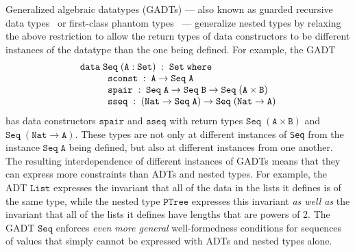 \documentclass{lmcs}
\theoremstyle{plain}\newtheorem{satz}[thm]{Satz}
\begin{document}
{Generalized algebraic datatypes (GADTs) --- also known as guarded
recursive data types~\cite{xcc03} or first-class phantom
types~\cite{ch03} --- generalize nested types by relaxing the above
restriction to allow the return types of data constructors to be
different instances of the datatype than the one being defined. For
example, the GADT
\[\begin{array}{l}
\mathtt{data\; Seq \;(A : Set)\;:\;Set\;where}\\
\hspace*{0.4in}\mathtt{sconst\;:\; A \rightarrow Seq\;A}\\
\hspace*{0.4in}\mathtt{spair\;:\;Seq\;A \rightarrow Seq\;B \rightarrow
  Seq\;(A\times B)}\\
\hspace*{0.4in}\mathtt{sseq\;:\;(Nat \rightarrow Seq\;A) \rightarrow
  Seq\;(Nat \to A)}
\end{array}\]
\noindent
\!\!has data constructors $\mathtt{spair}$ and $\mathtt{sseq}$ with
return types $\mathtt{Seq\; (A \times B)}$ and $\mathtt{Seq\;(Nat \to
  A)}$. These types are not only at different instances of \verb|Seq|
from the instance $\mathtt{Seq\; A}$ being defined, but also at
different instances from one another. The resulting interdependence of
different instances of GADTs means that they can express more
constraints than ADTs and nested types. For example, the ADT
$\mathtt{List}$ expresses the invariant that all of the data in the
lists it defines is of the same type, while the nested type
$\mathtt{PTree}$ expresses this invariant {\em as well as} the
invariant that all of the lists it defines have lengths that are
powers of 2. The GADT $\mathtt{Seq}$ enforces {\em even more general}
well-formedness conditions for sequences of values that simply cannot
be expressed with ADTs and nested types alone.

}
\end{document}
